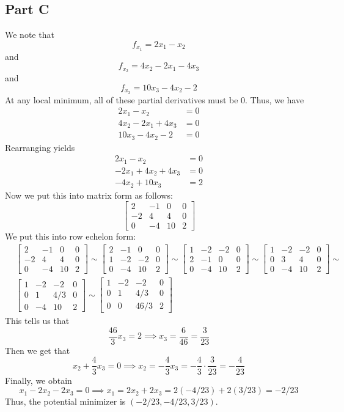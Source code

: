 \documentclass[12pt]{article}
\begin{document}
\subsection*{Part C}
We note that
\[
f_{x_1} = 2x_1 - x_2
\] and
\[
f_{x_2} = 4x_2 - 2x_1 - 4x_3
\] and
\[
f_{x_3} = 10x_3 - 4x_2 - 2
\] At any local minimum, all of these partial derivatives must be $0$. Thus, we have
\begin{align*}
2x_1 - x_2 &= 0\\
4x_2 - 2x_1 + 4x_3 &= 0\\
10x_3 - 4x_2 - 2 &= 0
\end{align*} Rearranging yields
\begin{align*}
2x_1 - x_2 &= 0\\
-2x_1 + 4x_2 + 4x_3 &= 0\\
-4x_2 + 10x_3 &= 2
\end{align*} Now we put this into matrix form as follows:
\[
\begin{bmatrix}
2 & -1 & 0 & 0\\
-2 & 4 & 4 & 0\\
0 & -4 & 10 & 2
\end{bmatrix} 
\] We put this into row echelon form:
\begin{align*} 
&\begin{bmatrix}
2 & -1 & 0 & 0\\
-2 & 4 & 4 & 0\\
0 & -4 & 10 & 2
\end{bmatrix} \sim
\begin{bmatrix}
2 & -1 & 0 & 0\\
1 & -2 & -2 & 0\\
0 & -4 & 10 & 2
\end{bmatrix} \sim 
\begin{bmatrix}
1 & -2 & -2 & 0\\
2 & -1 & 0 & 0\\
0 & -4 & 10 & 2
\end{bmatrix} \sim
\begin{bmatrix}
1 & -2 & -2 & 0\\
0 & 3 & 4 & 0\\
0 & -4 & 10 & 2
\end{bmatrix} \sim \\
& \begin{bmatrix}
1 & -2 & -2 & 0\\
0 & 1 & 4/3 & 0\\
0 & -4 & 10 & 2
\end{bmatrix} \sim 
\begin{bmatrix}
1 & -2 & -2 & 0\\
0 & 1 & 4/3 & 0\\
0 & 0 & 46/3 & 2
\end{bmatrix} 
\end{align*} This tells us that
\[
\frac{46}{3}x_3 = 2 \implies x_3 = \frac{6}{46} = \frac{3}{23}
\] Then we get that
\[
x_2 + \frac{4}{3}x_3 = 0 \implies x_2 = -\frac{4}{3}x_3 = -\frac{4}{3}\cdot \frac{3}{23} = -\frac{4}{23}
\] Finally, we obtain
\[
x_1 - 2x_2 - 2x_3 = 0 \implies x_1 = 2x_2 + 2x_3 = 2(-4/23) + 2(3/23) = -2/23
\] Thus, the potential minimizer is $(-2/23,-4/23,3/23)$.
\newpage
\end{document}

